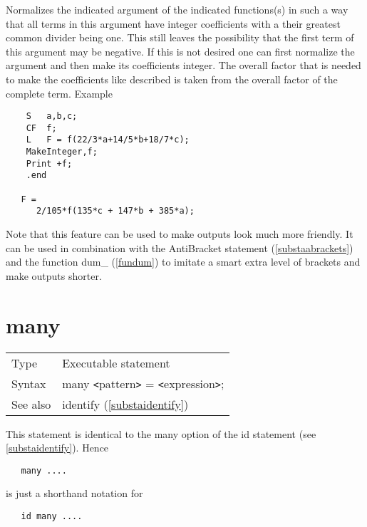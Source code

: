 \noindent Normalizes the indicated 
argument of the indicated functions(s) in such a way that 
all terms in this argument have integer 
coefficients with a their greatest common 
divider being one. This still leaves the possibility that the first term of 
this argument may be negative. If this is not desired one can first 
normalize the argument and then make its coefficients 
integer. The overall factor that is needed to make the coefficients like 
described is taken from the overall factor of the complete term. Example
\begin{verbatim}
    S   a,b,c;
    CF  f;
    L   F = f(22/3*a+14/5*b+18/7*c);
    MakeInteger,f;
    Print +f;
    .end

   F =
      2/105*f(135*c + 147*b + 385*a);
\end{verbatim}

\noindent Note that this feature can be used to make outputs look much more 
friendly. It can be used in combination with the 
AntiBracket statement (\ref{substaabrackets}) and the 
function dum\_ (\ref{fundum}) to imitate a smart extra level 
of brackets and make outputs shorter.
\vspace{10mm}

 
\section{many}
\label{substamany}

\noindent \begin{tabular}{ll}
Type & Executable statement\\
Syntax & many {\tt<}pattern{\tt>} = {\tt<}expression{\tt>};
\\ See also & identify (\ref{substaidentify})
\end{tabular} \vspace{4mm}

\noindent This statement is identical to the many option of the 
id statement (see \ref{substaidentify}). Hence
\begin{verbatim}
   many ....
\end{verbatim}
is just a shorthand notation for
\begin{verbatim}
   id many ....
\end{verbatim}
\vspace{10mm}

